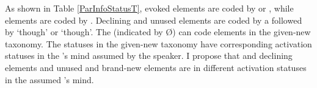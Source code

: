 As shown in Table \ref{ParInfoStatusT},
evoked elements are coded by  or ,
while  elements are coded by .
Declining and unused elements are coded by a  followed by  `though' or  `though'.
The  (indicated by {\O}) can code elements in the given-new taxonomy.
The statuses in the given-new taxonomy have corresponding activation statuses in the 's mind assumed by the speaker.
I propose that  and declining elements and unused and brand-new elements are in different activation statuses in the assumed 's mind.

